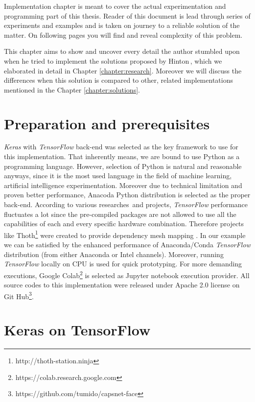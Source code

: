Implementation chapter is meant to cover the actual experimentation and programming part of this thesis. Reader of this document is lead through series of experiments and examples and is taken on journey to a reliable solution of the matter. On following pages you will find and reveal complexity of this problem.

This chapter aims to show and uncover every detail the author stumbled upon when he tried to implement the solutions proposed by Hinton\,\cite{capsule}, which we elaborated in detail in Chapter \ref{chapter:research}. Moreover we will discuss the differences when this solution is compared to other, related implementations mentioned in the Chapter \ref{chapter:solutions}.

\section{Preparation and prerequisites}

\textit{Keras} with \textit{TensorFlow} back-end was selected as the key framework to use for this implementation. That inherently means, we are bound to use Python as a programming language. However, selection of Python is natural and reasonable anyways, since it is the most used language in the field of machine learning, artificial intelligence experimentation. Moreover due to technical limitation and proven better performance, Anacoda Python distribution is selected as the proper back-end. According to various researches\, and projects, \textit{TensorFlow} performance fluctuates a lot since the pre-compiled packages are not allowed to use all the capabilities of each and every specific hardware combination. Therefore projects like Thoth\footnote{http://thoth-station.ninja} were created to provide dependency mesh mapping . In our example we can be satisfied by the enhanced performance of Anaconda/Conda \textit{TensorFlow} distribution (from either Anaconda or Intel channels). Moreover, running \textit{TensorFlow} locally on CPU is used for quick prototyping. For more demanding executions, Google Colab\footnote{https://colab.research.google.com} is selected as Jupyter notebook execution provider. All source codes to this implementation were released under Apache 2.0 license on Git Hub\footnote{https://github.com/tumido/capsnet-face}.

\section{Keras on TensorFlow}


